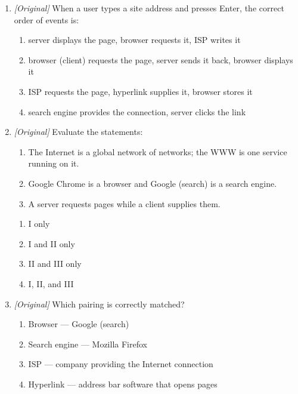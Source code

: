 \documentclass[11pt]{article}
\begin{document}
\begin{enumerate}[label=\textbf{Q\arabic*.}, leftmargin=*]
\item \textit{[Original]} When a user types a site address and presses Enter,
  the correct order of events is:
  \begin{enumerate}[label=\Alph*.]
    \item server displays the page, browser requests it, ISP writes it
    \item browser (client) requests the page, server sends it back, browser
      displays it
    \item ISP requests the page, hyperlink supplies it, browser stores it
    \item search engine provides the connection, server clicks the link
  \end{enumerate}
\item \textit{[Original]} Evaluate the statements:
  \begin{enumerate}[label=\Roman*.]
    \item The Internet is a global network of networks; the WWW is one
      service running on it.
    \item Google Chrome is a browser and Google (search) is a search engine.
    \item A server requests pages while a client supplies them.
  \end{enumerate}
  \begin{enumerate}[label=\Alph*.]
    \item I only
    \item I and II only
    \item II and III only
    \item I, II, and III
  \end{enumerate}
\item \textit{[Original]} Which pairing is correctly matched?
  \begin{enumerate}[label=\Alph*.]
    \item Browser --- Google (search)
    \item Search engine --- Mozilla Firefox
    \item ISP --- company providing the Internet connection
    \item Hyperlink --- address bar software that opens pages
  \end{enumerate}


\end{enumerate}
\end{document}

